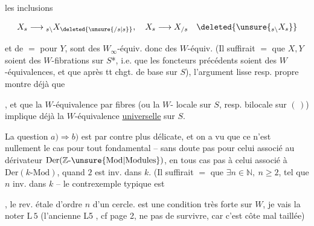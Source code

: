 les inclusions

\[
 X_s\longrightarrow {}_{s\backslash}X_{\deleted{\unsure{/s|s}}},\quad X_s\longrightarrow X_{/s}\quad\deleted{\unsure{{}_{s\backslash}X_s}}
\]

et de $=$ pour $Y$, sont des $W_{\infty}$-équiv. donc des $W$-équiv.
(Il suffirait $=$ que $X,Y$ soient des $W$-fibrations  sur $S$*, i.e.  que les foncteurs précédents soient des $W$-équivalences, et que   après tt chgt. de base sur $S$), l'argument  lisse resp. propre montre déjà que



, et que la $W$-équivalence par fibres  (ou la $W$- locale sur $S$, resp. bilocale sur $(\,)$) implique déjà la $W$-équivalence \uline{universelle} sur $S$.

La question $a)\Rightarrow b)$ est par contre  plus délicate, et on a vu que ce n'est  nullement le cas pour tout  fondamental -- sans doute pas pour celui associé au dérivateur $\mathrm{Der}(\mathbb Z\text{-}\unsure{\mathrm{Mod}|\mathrm{Modules}})$, en tous cas pas à celui associé à $\mathrm{Der}(k\text{-}\mathrm{Mod})$, quand $2$ est inv. dans $k$. (Il suffirait $=$  que $\exists n\in\mathbb N,\ n\geq 2$, tel que $n$ inv. dans $k$ -- le contrexemple typique est


, le rev. étale d'ordre $n$ d'un cercle.  est  une condition très forte sur $W$, je vais la noter $\mathrm L\,5$ (l'ancienne L5 , cf page 2,  ne  pas de survivre, car c'est  côte mal taillée)

